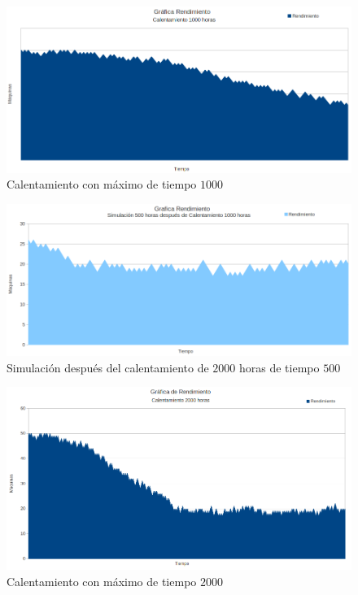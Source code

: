 \documentclass[12pt]{article}
\begin{document}
\begin{figure}
  \centering
	\includegraphics[scale=0.6]{graf1.png} 
  \caption{Calentamiento con m\'aximo de tiempo $1000$}
  \label{fig:cal1}
\end{figure}

\begin{figure}
  \centering
	\includegraphics[scale=0.6]{graf2.png} 
  \caption{Simulaci\'on despu\'es del calentamiento de $2000$ horas de tiempo $500$}
  \label{fig:descal1}
\end{figure}

\begin{figure}
  \centering
	\includegraphics[scale=0.6]{graf3.png} 
  \caption{Calentamiento con m\'aximo de tiempo $2000$}
  \label{fig:descal2}
\end{figure}
\end{document}
